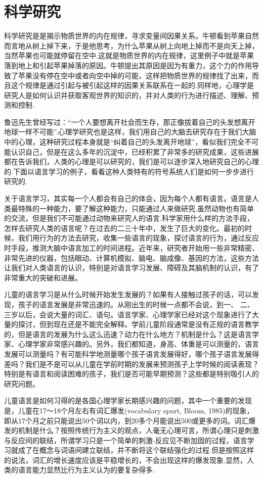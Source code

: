 \section{科学研究}

科学研究是是揭示物质世界的内在规律，寻求变量间因果关系。牛顿看到苹果自然而言地从树上掉下来，于是他思考，为什么苹果从树上向地上掉而不是向天上掉，当然苹果也可能就停留在空中.这就是物质世界的内在规律，这里例子中就是苹果落到地上和引起苹果掉落的原因。牛顿提出其原因是因为有重力，这个力的作用导致了苹果没有停在空中或者向空中掉的可能，这样把物质世界的规律找了出来，而且这个规律是通过引起与被引起这样的因果关系联系在一起的.同样地，心理学是研究人是如何认识并获取客观世界的知识的，并对人类的行为进行描述、理解、预测和控制.

鲁迅先生曾经写过：“一个人要想离开社会而生存，那正像拔着自己的头发想离开地球一样不可能”.心理学研究也是这样，我们用自己的大脑去研究存在于我们大脑中的心理，这种研究过程本身就是“纠着自己的头发离开地球”，看似我们完全不可能认识自己，但是在这么多年的沉淀中，已经积累了非常多的研究成果，这些进展都在告诉我们，人类的心理是可以研究的，我们是可以逐步深入地研究自己的心理的.下面以语言学习的例子，看看这种人类特有的符号系统人们是如何一步步进行研究的.

关于语言学习，其实每一个人都会有自己的体会，因为每个人都有语言。语言是人类最特殊的一种能力，要了解这种能力，只能通过人来做研究.虽然动物也有简单的交流，但是我们不可能通过动物来研究人的语言.科学家用什么样的方法手段，怎样去研究人类的语言呢？在过去的二三十年中，发生了巨大的变化。最初的时候，我们用行为的方法去研究，收集一些语言的现象，探讨语言的行为，通过反应时手段，推测大脑中语言加工的时间进程。近年来，研究者开始用一些非常精密、非常先进的仪器，包括眼动、计算机模拟、脑电、脑成像、基因的方法，这些方法让我们对人类语言的认识，特别是对语言学习发展、障碍及其脑机制的认识，有了非常重大的突破和进展。

儿童的语言学习是从什么时候开始发生发展的？如果有人接触过孩子的话，可以发现，孩子的语言发展是非常迅速的。从刚出生的时候一点都不会说，到一、
二、三岁以后，会说大量的词汇、语句。语言学家、心理学家已经对这个现象进行了大量的探讨，但到现在还是不能完全解释。学前儿童阶段通常是没有正规的语言教学的，但是语言的发展为什么这么迅速？动力在什么地方？机制是什么？这是语言学家、心理学家非常感兴趣的。另外，我们都知道，身高、体重是可以测量的，语言发展可以测量吗？有可能科学地测量哪个孩子语言发展得好，哪个孩子语言发展得差吗？我们是不是可以从儿童在学前时期的发展来预测孩子上学时候的阅读表现？特别是有语言和阅读困难的孩子，我们是否可能早期预测？这些都是特别吸引人的研究问题。

儿童语言是如何习得的是各国心理学家长期感兴趣的问题，其中一个重要的发现是，儿童在17～18个月左右有词汇爆发(vocabulary spurt, Bloom, 1985)的现象，即从17个月之前只能说出50个词以内，到20多个月能说出500或更多的词。词汇爆发的机制是什么？按照传统行为主义的观点，人毫无心理可言，所谓心理只是刺激与反应间的联结，所谓学习只是一个简单的刺激-反应见不断加固的过程，语言学习就成了在概念与词语间建立联结，并不断将这个联结强化的过程.但是按照这样的说法，词汇的增长速度应该是平稳增长的，不会出现这样的爆发现象.显然，人类的语言能力显然比行为主义认为的要复杂得多.

